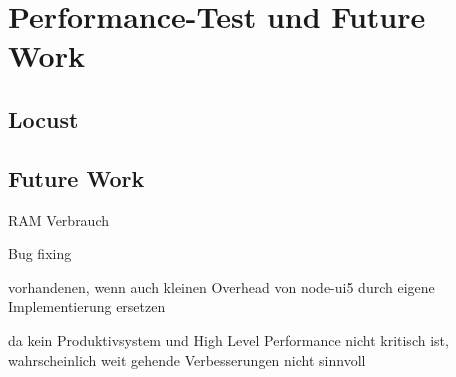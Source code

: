 \chapter{Performance-Test und Future Work}

\section{Locust}

\section{Future Work}
RAM Verbrauch

Bug fixing

vorhandenen, wenn auch kleinen Overhead von node-ui5 durch eigene Implementierung ersetzen

da kein Produktivsystem und High Level Performance nicht kritisch ist, wahrscheinlich weit gehende Verbesserungen nicht sinnvoll